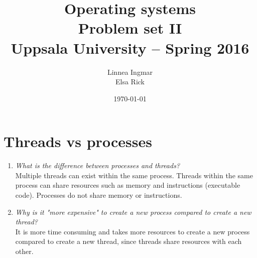 \documentclass[a4paper]{article}
\title{\textbf{Operating systems \\
    Problem set II \\
    Uppsala University -- Spring 2016 \\}}
\author{Linnea Ingmar \\
  Elsa Rick}
\date{\today}
\begin{document}
\maketitle

\section{Threads vs processes}
\begin{enumerate}
  \item \textit{What is the difference between processes and threads?} \\

    Multiple threads can exist within the same process. Threads within the same process can share resources such as memory and instructions (executable code). Processes do not share memory or instructions.
  \item \textit{ Why is it "more expensive" to create a new process compared to create a new thread?} \\

    It is more time consuming and takes more resources to create a new process compared to create a new thread, since threads share resources with each other.
\end{enumerate}
\end{document}
